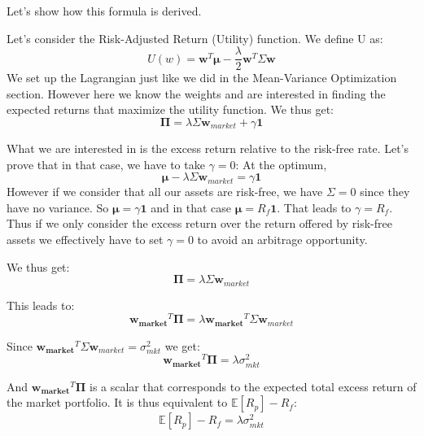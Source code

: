 \documentclass[11pt,a4paper]{article}
\begin{document}
Let's show how this formula is derived.

Let's consider the Risk-Adjusted Return (Utility) function. We define U as:
\begin{equation}
    U(w) = \mathbf{w}^T \mathbf{\mu} - \frac{\lambda}{2} \mathbf{w}^T \Sigma \mathbf{w}
\end{equation}
We set up the Lagrangian just like we did in the Mean-Variance Optimization section.
However here we know the weights and are interested in finding the expected returns that maximize the utility function.
We thus get:
\begin{equation}
    \bm{\Pi} = \lambda \Sigma \mathbf{w}_{market} + \gamma \mathbf{1}
\end{equation}

What we are interested in is the excess return relative to the risk-free rate. 
Let's prove that in that case, we have to take $\gamma = 0$:
At the optimum,
\begin{equation}
\mathbf{\mu} - \lambda \Sigma \mathbf{w}_{market} = \gamma \mathbf{1}
\end{equation}
However if we consider that all our assets are risk-free, we have $\Sigma = 0$ since they have no variance.
So $\mathbf{\mu} = \gamma \mathbf{1}$ and in that case $\mathbf{\mu} = R_f \mathbf{1}$.
That leads to $\gamma = R_f$.
Thus if we only consider the excess return over the return offered by risk-free assets we effectively have to set $\gamma = 0$ to avoid an arbitrage opportunity.

We thus get:
\begin{equation}
    \bm{\Pi} = \lambda \Sigma \mathbf{w}_{market}
\end{equation}

This leads to:
\begin{equation}
    \mathbf{w_{market}}^T \bm{\Pi} = \lambda \mathbf{w_{market}}^T \Sigma \mathbf{w}_{market}
\end{equation}

Since $\mathbf{w_{market}}^T \Sigma \mathbf{w}_{market} = \sigma_{mkt}^2$ we get:
\begin{equation}
    \mathbf{w_{market}}^T \bm{\Pi} = \lambda \sigma_{mkt}^2
\end{equation}

And $\mathbf{w_{market}}^T \bm{\Pi}$ is a scalar that corresponds to the expected total excess return of the market portfolio.
It is thus equivalent to $\mathbb{E}[R_p] - R_f$:
\begin{equation}
    \mathbb{E}[R_p] - R_f = \lambda \sigma_{mkt}^2
\end{equation}
\end{document}
